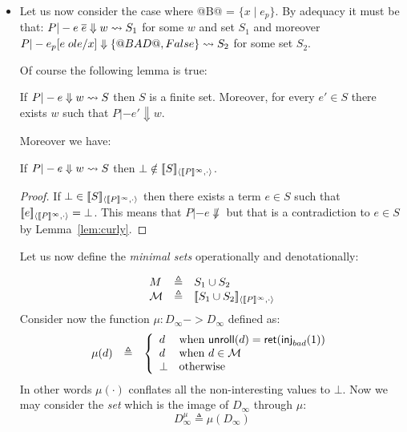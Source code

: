 \documentclass[preprint,nocopyrightspace,draft]{sigplanconf}
\begin{document}
\begin{itemize}
  \item Let us now consider the case where @B@ = $\{ x \mid e_p \}$. By adequacy it must
  be that: $P |- e\;\overline{e} \Downarrow w \rightsquigarrow S_1$ for some $w$ and set $S_1$ and moreover
  $P |- e_p[e\;ol{e}/x] \Downarrow \{ @BAD@, False \} \rightsquigarrow S_2$ for some set $S_2$. 

  Of course the following lemma is true:
  \begin{lemma}\label{lem:curly} 
    If $P |- e \Downarrow w \rightsquigarrow S$ then $S$ is a finite set. Moreover, 
    for every $e' \in S$ there exists $w$ such that $P |- e' \Downarrow w$.
  \end{lemma}
  Moreover we have:
  \begin{lemma}\label{lem:bot-not-redex} 
     If $P |- e \Downarrow w \rightsquigarrow S$ then 
     $\bot \notin [\![S]\!]_{\langle {[\![P]\!]^{\infty}},{\cdot}\rangle}$. 
  \end{lemma}
  \begin{proof} If $\bot \in [\![S]\!]_{\langle {[\![P]\!]^{\infty}},{\cdot}\rangle}$ then there exists
  a term $e \in S$ such that $[\![e]\!]_{\langle {[\![P]\!]^{\infty}},{\cdot}\rangle} = \bot$. This means
  that $P |- e \not\Downarrow$ but that is a contradiction to $e \in S$ by 
  Lemma~\ref{lem:curly}.
  \end{proof}

  Let us now define the {\em minimal sets} operationally and denotationally:
  \newcommand{\Min}{\cal M}

  \[\begin{array}{lcl}
           M        & \triangleq & S_1 \cup S_2 \\
           {\cal M} & \triangleq & [\![S_1\cup S_2]\!]_{\langle {[\![P]\!]^{\infty}},{\cdot}\rangle}
  \end{array}\]
  Consider now the function $\mu : D_\infty -> D_\infty$ defined as: 
  \[\begin{array}{lcl} 
        \mu(d) & \triangleq & \left\{ \begin{array}{ll} 
                   d           & \text{when } \unroll(d) = \ret(\inj{bad}(1)) \\
                   d           & \text{when } d \in \Min \\ 
                   \bot        & \text{otherwise } 
                                      \end{array}\right.
  \end{array}\] 
  In other words $\mu(\cdot)$ conflates all the non-interesting values to $\bot$. 
  Now we may consider the {\em set} which is the image of $D_\infty$ through $\mu$: 
  \[ D_\infty^\mu  \triangleq \mu(D_\infty) \] 


\end{itemize}
\end{document}

